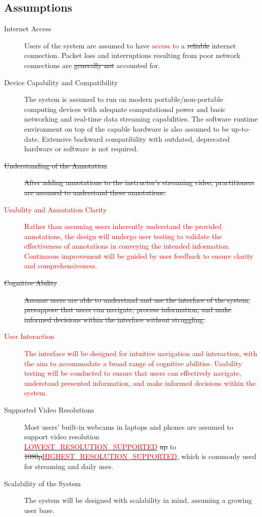 \documentclass[12pt]{article}
\begin{document}
\subsection{Assumptions}
\begin{description}
    \item[Internet Access] Users of the system are assumed to have \textcolor{red}{access to }a \sout{reliable} internet connection. Packet loss and interruptions resulting from poor network connections are \sout{generally not} accounted for.
    \item[Device Capability and Compatibility] The system is assumed to run on modern portable/non-portable computing devices with adequate computational power and basic networking and real-time data streaming capabilities. The software runtime environment on top of the capable hardware is also assumed to be up-to-date. Extensive backward compatibility with outdated, deprecated hardware or software is not required.
    \item[\sout{Understanding of the Annotation}] \sout{After adding annotations to the instructor’s streaming video, practitioners are assumed to understand these annotations.}
    \item[\textcolor{red}{Usability and Annotation Clarity}] \textcolor{red}{Rather than assuming users inherently understand the provided annotations, the design will undergo user testing to validate the effectiveness of annotations in conveying the intended information. Continuous improvement will be guided by user feedback to ensure clarity and comprehensiveness.}
    \item[\sout{Cognitive Ability}] \sout{Assume users are able to understand and use the interface of the system, presuppose that users can navigate, process information, and make informed decisions within the interface without struggling.}
    \item[\textcolor{red}{User Interaction}] \textcolor{red}{The interface will be designed for intuitive navigation and interaction, with the aim to accommodate a broad range of cognitive abilities. Usability testing will be conducted to ensure that users can effectively navigate, understand presented information, and make informed decisions within the system.}
    \item[Supported Video Resolutions] Most users’ built-in webcams in laptops and phones are assumed to support video resolution\\ \hyperref[sec:symbolic-constants]{\textcolor{red}{LOWEST\_RESOLUTION\_SUPPORTED}} \sout{up} to \\\sout{1080p}\hyperref[sec:symbolic-constants]{\textcolor{red}{HIGHEST\_RESOLUTION\_SUPPORTED}}, which is commonly used for streaming and daily uses.
    \item[Scalability of the System] The system will be designed with scalability in mind, assuming a growing user base.
\end{description}
\end{document}
